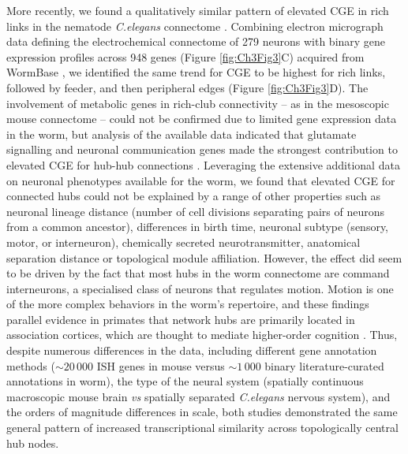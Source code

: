 More recently, we found a qualitatively similar pattern of elevated CGE in rich links in the nematode \textit{C.elegans} connectome \citep{Arnatkeviciute2018}.
Combining electron micrograph data defining the electrochemical connectome of 279 neurons \citep{Varshney2011} with binary gene expression profiles across 948 genes (Figure \ref{fig:Ch3Fig3}C) acquired from WormBase \mbox{\citep{Harris2010}}, we identified the same trend for CGE to be highest for rich links, followed by feeder, and then peripheral edges (Figure \ref{fig:Ch3Fig3}D).
The involvement of metabolic genes in rich-club connectivity -- as in the mesoscopic mouse connectome \citep{Fulcher2016} -- could not be confirmed due to limited gene expression data in the worm, but analysis of the available data indicated that glutamate signalling and neuronal communication genes made the strongest contribution to elevated CGE for hub-hub connections \citep{Arnatkeviciute2018}.
Leveraging the extensive additional data on neuronal phenotypes available for the worm, we found that elevated CGE for connected hubs could not be explained by a range of other properties such as neuronal lineage distance (number of cell divisions separating pairs of neurons from a common ancestor), differences in birth time, neuronal subtype (sensory, motor, or interneuron), chemically secreted neurotransmitter, anatomical separation distance or topological module affiliation. However, the effect did seem to be driven by the fact that most hubs in the worm connectome are command interneurons, a specialised class of neurons that regulates motion. Motion is one of the more complex behaviors in the worm’s repertoire, and these findings parallel evidence in primates that network hubs are primarily located in association cortices, which are thought to mediate higher-order cognition \mbox{\citep{Achard2006,Sporns2007}}.
Thus, despite numerous differences in the data, including different gene annotation methods ($\sim20\,000$ ISH genes in mouse versus $\sim1\,000$ binary literature-curated annotations in worm), the type of the neural system (spatially continuous macroscopic mouse brain \textit{vs} spatially separated \textit{C.elegans} nervous system), and the orders of magnitude differences in scale, both studies demonstrated the same general pattern of increased transcriptional similarity across topologically central hub nodes.


